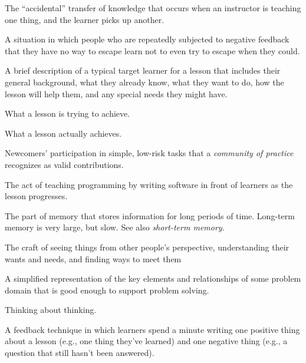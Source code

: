 \begin{description}


The ``accidental'' transfer of knowledge that occurs when an
instructor is teaching one thing, and the learner picks up another.

 A situation in
which people who are repeatedly subjected to negative feedback that
they have no way to escape learn not to even try to escape when they
could.

 A brief description of a
typical target learner for a lesson that includes their general
background, what they already know, what they want to do, how the
lesson will help them, and any special needs they might have.

 What a lesson is
trying to achieve.

 What a lesson actually
achieves.

 Newcomers' participation in simple, low-risk tasks
that a \emph{community of practice} recognizes as valid contributions.

 The act of teaching programming
by writing software in front of learners as the lesson progresses.

 The part of memory
that stores information for long periods of time. Long-term memory is
very large, but slow. See also \emph{short-term memory}.


 The craft of seeing things from
other people's perspective, understanding their wants and needs, and
finding ways to meet them

 A simplified representation of
the key elements and relationships of some problem domain that is good
enough to support problem solving.

 Thinking about thinking.

 A feedback technique in which
learners spend a minute writing one positive thing about a lesson
(e.g., one thing they've learned) and one negative thing (e.g., a
question that still hasn't been answered).


\end{description}
